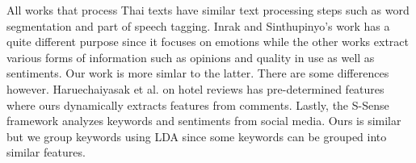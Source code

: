 All works that process Thai texts have similar text processing steps such as word segmentation and part of speech tagging. Inrak and Sinthupinyo's work \cite{emotioninthai} has a quite different purpose since it focuses on emotions while the other works \cite{thaiopinionmininghotel,ssense,ssense2} extract various forms of information such as opinions and quality in use as well as sentiments. Our work is more simlar to the latter. There are some differences however. Haruechaiyasak et al. \cite{thaiopinionmininghotel} on hotel reviews has pre-determined features where ours dynamically extracts features from comments. Lastly, the S-Sense framework \cite{ssense,ssense2} analyzes keywords and sentiments from social media. Ours is similar but we group keywords using LDA since some keywords can be grouped into similar features. 



